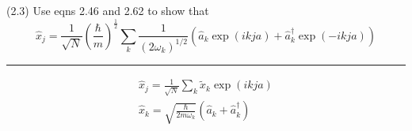 \documentclass[12pt]{article}
\begin{document}
(2.3)
Use eqns 2.46 and 2.62 to show that
\begin{equation*}
\hat x_j=\frac{1}{\sqrt{N}}
\left(\frac{\hbar}{m}\right)^\frac{1}{2}
\sum_k
\frac{1}{(2\omega_k)^{1/2}}
\left(
\hat a_k\exp(ikja)+\hat a_k^\dag\exp(-ikja)
\right)
\tag{2.68}
\end{equation*}

\hrule

\begin{gather*}
\hat x_j=\frac{1}{\sqrt{N}}
\sum_k
\tilde x_k\exp(ikja)
\tag{2.46}
\\
\hat x_k=\sqrt{\frac{\hbar}{2m\omega_k}}
\left(\hat a_k+\hat a_k^\dag\right)
\tag{2.62}
\end{gather*}
\end{document}
